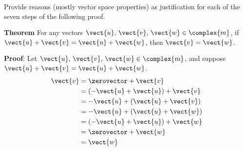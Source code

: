 Provide reasons (mostly vector space properties) as justification for each of the seven steps of the following proof.\par
%
{\bf Theorem}
For any vectors $\vect{u},\,\vect{v},\,\vect{w}\in\complex{m}$,
if $\vect{u} + \vect{v} = \vect{u} + \vect{w}$, then $\vect{v} = \vect{w}$.\par
%
{\bf Proof}: Let $\vect{u},\,\vect{v},\,\vect{w}\in\complex{m}$,
and suppose $\vect{u} + \vect{v} = \vect{u} + \vect{w}$.
%
\begin{align*}
\vect{v}
&= \zerovector + \vect{v}\\
&= (-\vect{u} + \vect{u}) + \vect{v}\\
&= -\vect{u} + (\vect{u} + \vect{v})\\
&= -\vect{u} + (\vect{u} + \vect{w})\\
&= (-\vect{u} + \vect{u}) + \vect{w}\\
&= \zerovector + \vect{w}\\
&= \vect{w}
\end{align*}
